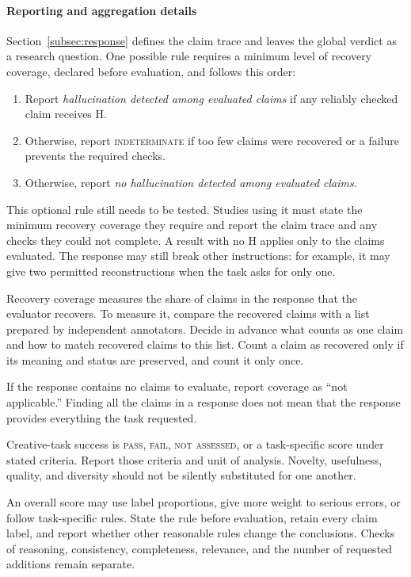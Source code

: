 \documentclass{clv2025}
\begin{document}
\paragraph{Reporting and aggregation details}
Section~\ref{subsec:response} defines the claim trace and leaves the global
verdict as a research question. One possible rule requires a minimum level
of recovery coverage, declared before evaluation, and follows this order:
\begin{enumerate}
\item Report \emph{hallucination detected among evaluated claims} if any reliably checked claim receives H.
\item Otherwise, report \textsc{indeterminate} if too few claims were recovered
or a failure prevents the required checks.
\item Otherwise, report \emph{no hallucination detected among evaluated claims}.
\end{enumerate}
This optional rule still needs to be tested. Studies using it must state
the minimum recovery coverage they require and report the claim trace
and any checks they could not complete. A result with no H applies only
to the claims evaluated. The response may still break other instructions:
for example, it may give two permitted reconstructions when the task asks
for only one.

Recovery coverage measures the share of claims in the response that the
evaluator recovers. To measure it, compare the recovered claims with a
list prepared by independent annotators. Decide in advance what counts
as one claim and how to match recovered claims to this list. Count a
claim as recovered only if its meaning and status are preserved, and
count it only once.

If the response contains no claims to evaluate, report coverage as
``not applicable.'' Finding all the claims in a response does not mean
that the response provides everything the task requested.

Creative-task success is \textsc{pass}, \textsc{fail}, \textsc{not assessed},
or a task-specific score under stated criteria. Report those criteria and
unit of analysis. Novelty, usefulness, quality, and diversity should not be
silently substituted for one another.

An overall score may use label proportions, give more weight to serious
errors, or follow task-specific rules. State the rule before evaluation,
retain every claim label, and report whether other reasonable rules change
the conclusions. Checks of reasoning, consistency, completeness, relevance,
and the number of requested additions remain separate.
\end{document}
